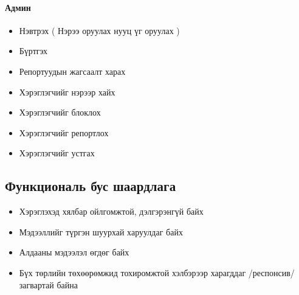 \documentclass[
oneside, %
english, %
onehalfspacing, %
nolistspacing, %
headsepline, %
]{article} %
\begin{document}
     \paragraph {Админ}
     \begin{itemize}
 	
 	\item Нэвтрэх ( Нэрээ оруулах нууц үг оруулах )
 	\item Бүртгэх
 	\item Репортуудын жагсаалт харах
 	\item Хэрэглэгчийг нэрээр хайх
 	\item Хэрэглэгчийг блоклох
 	\item Хэрэглэгчийг репортлох
 	\item Хэрэглэгчийг устгах
 
 	
    \end{itemize}
	\subsection{Функциональ бус шаардлага}
	\begin{itemize}
		\item Хэрэглэхэд хялбар ойлгомжтой, дэлгэрэнгүй байх
		\item Мэдээллийг түргэн шуурхай харуулдаг байх
		\item Алдааны мэдээлэл өгдөг байх 
		\item Бүх төрлийн төхөөрөмжид тохиромжтой хэлбэрээр харагддаг /респонсив/ загвартай байна
	\end{itemize}
\end{document}
